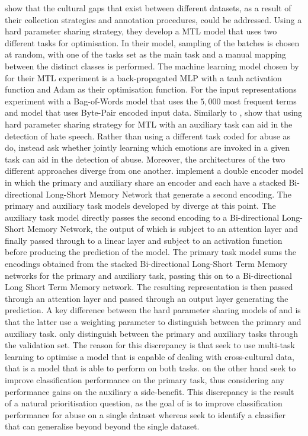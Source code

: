 \citet{Waseem:2018} show that the cultural gaps that exist between different datasets, as a result of their collection strategies and annotation procedures, could be addressed.
Using a hard parameter sharing strategy, they develop a MTL model that uses two different tasks for optimisation.
In their model, sampling of the batches is chosen at random, with one of the tasks set as the main task and a manual mapping between the distinct classes is performed.
The machine learning model chosen by \citet{Waseem:2018} for their MTL experiment is a back-propagated MLP with a tanh activation function and Adam as their optimisation function.
For the input representations \citet{Waseem:2018} experiment with a Bag-of-Words model that uses the $5,000$ most frequent terms and model that uses Byte-Pair encoded input data.
Similarly to \citet{Waseem:2018}, \citet{Rajamanickam:2020} show that using hard parameter sharing strategy for MTL with an auxiliary task can aid in the detection of hate speech.
Rather than using a different task coded for abuse as \citet{Waseem:2018} do, \citet{Rajamanickam:2020} instead ask whether jointly learning which emotions are invoked in a given task can aid in the detection of abuse.
Moreover, the architectures of the two different approaches diverge from one another.
\citet{Rajamanickam:2020} implement a double encoder model in which the primary and auxiliary share an encoder and each have a stacked Bi-directional Long-Short Memory Network that generate a second encoding.
The primary and auxiliary task models developed by \citet{Rajamanickam:2020} diverge at this point. The auxiliary task model directly passes the second encoding to a Bi-directional Long-Short Memory Network, the output of which is subject to an attention layer and finally passed through to a linear layer and subject to an activation function before producing the prediction of the model.
The primary task model sums the encodings obtained from the stacked Bi-directional Long-Short Term Memory networks for the primary and auxiliary task, passing this on to a Bi-directional Long Short Term Memory network.
The resulting representation is then passed through an attention layer and passed through an output layer generating the prediction.
A key difference between the hard parameter sharing models of \citet{Waseem:2018} and \citet{Rajamanickam:2020} is that the latter use a weighting parameter to distinguish between the primary and auxiliary task.
\citet{Waseem:2018} only distinguish between the primary and auxiliary tasks through the validation set.
The reason for this discrepancy is that \citet{Waseem:2018} seek to use multi-task learning to optimise a model that is capable of dealing with cross-cultural data, that is a model that is able to perform on both tasks.
\citet{Rajamanickam:2020} on the other hand seek to improve classification performance on the primary task, thus considering any performance gains on the auxiliary a side-benefit.
This discrepancy is the result of a natural prioritisation question, as the goal of \citet{Rajamanickam:2020} is to improve classification performance for abuse on a single dataset whereas \citet{Waseem:2018} seek to identify a classifier that can generalise beyond beyond the single dataset.

